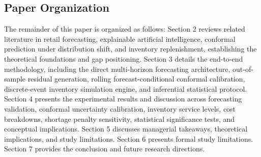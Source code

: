 \subsection{Paper Organization}
The remainder of this paper is organized as follows: Section 2 reviews related literature in retail forecasting, explainable artificial intelligence, conformal prediction under distribution shift, and inventory replenishment, establishing the theoretical foundations and gap positioning. Section 3 details the end-to-end methodology, including the direct multi-horizon forecasting architecture, out-of-sample residual generation, rolling forecast-conditional conformal calibration, discrete-event inventory simulation engine, and inferential statistical protocol. Section 4 presents the experimental results and discussion across forecasting validation, conformal uncertainty calibration, inventory service levels, cost breakdowns, shortage penalty sensitivity, statistical significance tests, and conceptual implications. Section 5 discusses managerial takeaways, theoretical implications, and study limitations. Section 6 presents formal study limitations. Section 7 provides the conclusion and future research directions.
